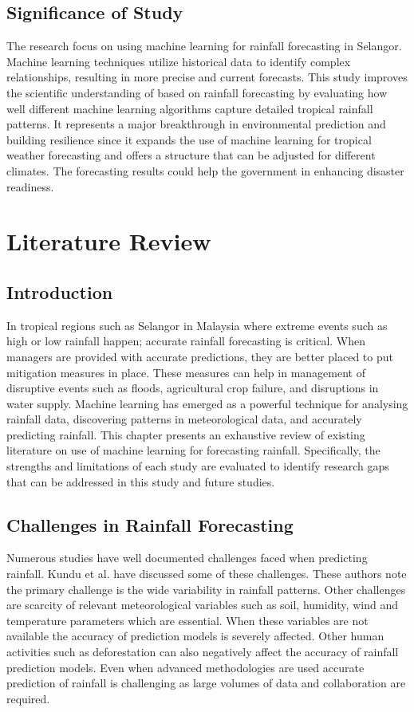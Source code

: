 \documentclass{article}
\begin{document}
\subsection{Significance of Study}
The research focus on using machine learning for rainfall forecasting in Selangor.
Machine learning techniques utilize historical data to identify complex relationships, resulting
in more precise and current forecasts. This study improves the scientific understanding of based
on rainfall forecasting by evaluating how well different machine learning algorithms capture
detailed tropical rainfall patterns. It represents a major breakthrough in environmental
prediction and building resilience since it expands the use of machine learning for tropical
weather forecasting and offers a structure that can be adjusted for different climates. The
forecasting results could help the government in enhancing disaster readiness.

\section{Literature Review}

\subsection{Introduction}

In tropical regions such as Selangor in Malaysia where extreme events such as high or
low rainfall happen; accurate rainfall forecasting is critical. When managers are provided with
accurate predictions, they are better placed to put mitigation measures in place. These measures
can help in management of disruptive events such as floods, agricultural crop failure, and
disruptions in water supply. Machine learning has emerged as a powerful technique for
analysing rainfall data, discovering patterns in meteorological data, and accurately predicting
rainfall. This chapter presents an exhaustive review of existing literature on use of machine
learning for forecasting rainfall. Specifically, the strengths and limitations of each study are
evaluated to identify research gaps that can be addressed in this study and future studies.

\subsection{Challenges in Rainfall Forecasting}

Numerous studies have well documented challenges faced when predicting rainfall.
Kundu et al. \cite{kundu_et_al_2023} have discussed some of these challenges. These authors note the primary
challenge is the wide variability in rainfall patterns. Other challenges are scarcity of relevant
meteorological variables such as soil, humidity, wind and temperature parameters which are
essential. When these variables are not available the accuracy of prediction models is severely
affected. Other human activities such as deforestation can also negatively affect the accuracy
of rainfall prediction models. Even when advanced methodologies are used accurate prediction
of rainfall is challenging as large volumes of data and collaboration are required.
\end{document}
